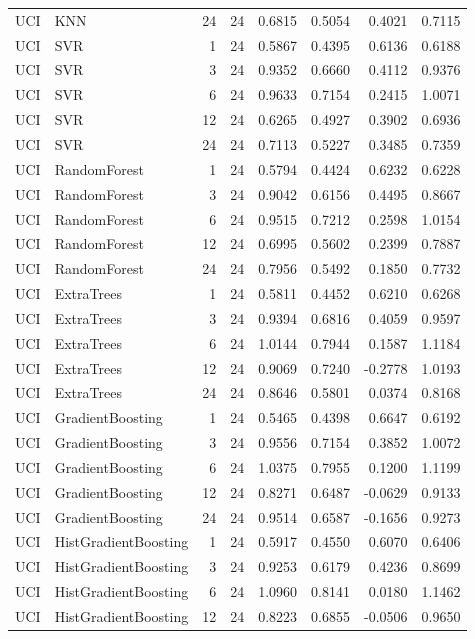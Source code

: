 \begin{tabular}{llrrrrrr}
UCI & KNN & 24 & 24 & 0.6815 & 0.5054 & 0.4021 & 0.7115 \\
UCI & SVR & 1 & 24 & 0.5867 & 0.4395 & 0.6136 & 0.6188 \\
UCI & SVR & 3 & 24 & 0.9352 & 0.6660 & 0.4112 & 0.9376 \\
UCI & SVR & 6 & 24 & 0.9633 & 0.7154 & 0.2415 & 1.0071 \\
UCI & SVR & 12 & 24 & 0.6265 & 0.4927 & 0.3902 & 0.6936 \\
UCI & SVR & 24 & 24 & 0.7113 & 0.5227 & 0.3485 & 0.7359 \\
UCI & RandomForest & 1 & 24 & 0.5794 & 0.4424 & 0.6232 & 0.6228 \\
UCI & RandomForest & 3 & 24 & 0.9042 & 0.6156 & 0.4495 & 0.8667 \\
UCI & RandomForest & 6 & 24 & 0.9515 & 0.7212 & 0.2598 & 1.0154 \\
UCI & RandomForest & 12 & 24 & 0.6995 & 0.5602 & 0.2399 & 0.7887 \\
UCI & RandomForest & 24 & 24 & 0.7956 & 0.5492 & 0.1850 & 0.7732 \\
UCI & ExtraTrees & 1 & 24 & 0.5811 & 0.4452 & 0.6210 & 0.6268 \\
UCI & ExtraTrees & 3 & 24 & 0.9394 & 0.6816 & 0.4059 & 0.9597 \\
UCI & ExtraTrees & 6 & 24 & 1.0144 & 0.7944 & 0.1587 & 1.1184 \\
UCI & ExtraTrees & 12 & 24 & 0.9069 & 0.7240 & -0.2778 & 1.0193 \\
UCI & ExtraTrees & 24 & 24 & 0.8646 & 0.5801 & 0.0374 & 0.8168 \\
UCI & GradientBoosting & 1 & 24 & 0.5465 & 0.4398 & 0.6647 & 0.6192 \\
UCI & GradientBoosting & 3 & 24 & 0.9556 & 0.7154 & 0.3852 & 1.0072 \\
UCI & GradientBoosting & 6 & 24 & 1.0375 & 0.7955 & 0.1200 & 1.1199 \\
UCI & GradientBoosting & 12 & 24 & 0.8271 & 0.6487 & -0.0629 & 0.9133 \\
UCI & GradientBoosting & 24 & 24 & 0.9514 & 0.6587 & -0.1656 & 0.9273 \\
UCI & HistGradientBoosting & 1 & 24 & 0.5917 & 0.4550 & 0.6070 & 0.6406 \\
UCI & HistGradientBoosting & 3 & 24 & 0.9253 & 0.6179 & 0.4236 & 0.8699 \\
UCI & HistGradientBoosting & 6 & 24 & 1.0960 & 0.8141 & 0.0180 & 1.1462 \\
UCI & HistGradientBoosting & 12 & 24 & 0.8223 & 0.6855 & -0.0506 & 0.9650 \\

\end{tabular}
